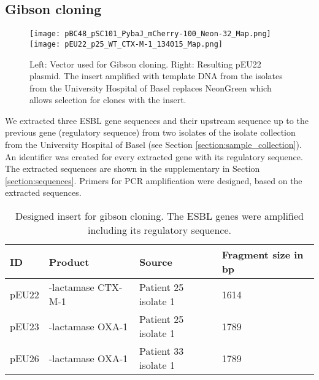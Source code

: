 \subsection{Gibson cloning}
\begin{figure}
	\texttt{[image: pBC48\_pSC101\_PybaJ\_mCherry-100\_Neon-32\_Map.png]}
	\texttt{[image: pEU22\_p25\_WT\_CTX-M-1\_134015\_Map.png]}
	\caption{Left: Vector used for Gibson cloning. Right: Resulting pEU22 plasmid. The insert amplified with template DNA from the isolates from the University Hospital of Basel replaces NeonGreen which allows selection for clones with the insert.}
	\label{figure:vec}
\end{figure}
We extracted three ESBL gene sequences and their upstream sequence up to the previous gene (regulatory sequence) from two isolates of the isolate collection from the University Hospital of Basel (see Section \ref{section:sample_collection}). An identifier was created for every extracted gene with its regulatory sequence. The extracted sequences are shown in the supplementary in Section \ref{section:sequences}. Primers for PCR amplification were designed, based on the extracted sequences.
\begin{table}[H]
	\begin{tabular}{|llll|} \hline
		ID    & Product                & Source             	& Fragment size in bp \\ \hline
		pEU22 & \textbeta-lactamase CTX-M-1 & Patient 25 isolate 1 &	1614 \\ \hline
		pEU23 & \textbeta-lactamase OXA-1   & Patient 25 isolate 1 & 1789\\ \hline
		pEU26 & \textbeta-lactamase OXA-1   & Patient 33 isolate 1 & 1789\\ \hline
	\end{tabular}
	\label{table:plasmid}
	\caption{Designed insert for gibson cloning. The ESBL genes were amplified including its regulatory sequence. }
\end{table}
